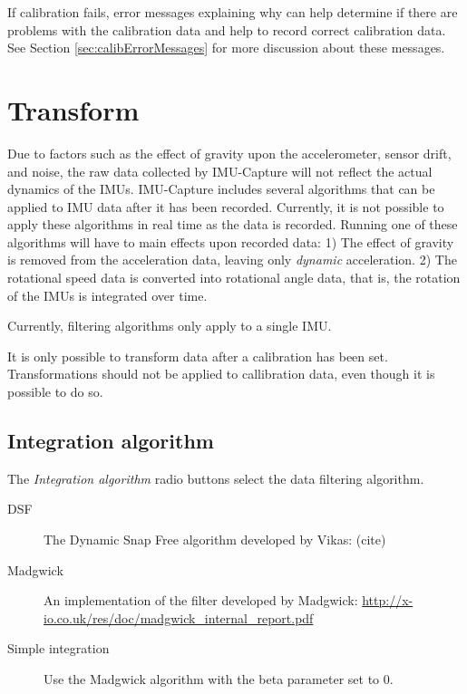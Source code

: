 \documentclass[11pt,letterpaper,article,oneside]{memoir}
\newcommand{\name}{IMU-Capture}
\begin{document}
If calibration fails, error messages explaining why can help determine if there
are problems with the calibration data and help to record correct calibration
data. See Section \ref{sec:calibErrorMessages} for more discussion about these
messages.




\chapter{Transform}


Due to factors such as the effect of gravity upon the accelerometer, sensor
drift, and noise, the raw data collected by \name{} will not reflect the actual
dynamics of the IMUs. \name{} includes several algorithms that can be applied to
IMU data after it has been recorded. Currently, it is not possible to apply
these algorithms in real time as the data is recorded. Running one of these
algorithms will have to main effects upon recorded data: 1) The effect of
gravity is removed from the acceleration data, leaving only \emph{dynamic}
acceleration. 2) The rotational speed data is converted into rotational angle
data, that is, the rotation of the IMUs is integrated over time.

Currently, filtering algorithms only apply to a single IMU.

It is only possible to transform data after a calibration has been set.
Transformations should not be applied to callibration data, even though it is
possible to do so.


\section{Integration algorithm}

The \emph{Integration algorithm} radio buttons select the data filtering
algorithm.

\begin{description}

\item[DSF]
The Dynamic Snap Free algorithm developed by Vikas: (cite)
\item[Madgwick] \hfill
An implementation of the filter developed by Madgwick: 
\url{http://x-io.co.uk/res/doc/madgwick_internal_report.pdf}
\item[Simple integration] \hfill
Use the Madgwick algorithm with the beta parameter set to 0.

\end{description}
\end{document}
